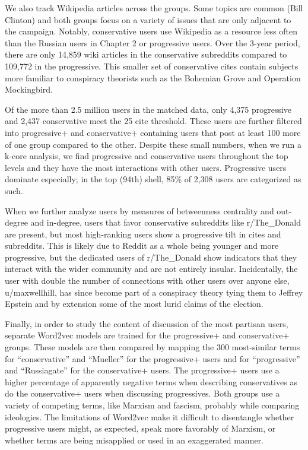 \documentclass[doublespacing]{utdthesis}
\begin{document}
We also track Wikipedia articles across the groups.
Some topics are common (Bill Clinton) and both groups focus on a variety of issues that are only adjacent to the campaign.
Notably, conservative users use Wikipedia as a resource less often than the Russian users in Chapter 2 or progressive users.
Over the 3-year period, there are only 14,859 wiki articles in the conservative subreddits compared to 109,772 in the progressive.
This smaller set of conservative cites contain subjects more familiar to conspiracy theorists such as the Bohemian Grove and Operation Mockingbird.

Of the more than 2.5 million users in the matched data, only 4,375 progressive and 2,437 conservative meet the 25 cite threshold.
These users are further filtered into progressive+ and conservative+ containing users that post at least 100 more of one group compared to the other.
Despite these small numbers, when we run a k-core analysis, we find progressive and conservative users throughout the top levels and they have the most interactions with other users.
Progressive users dominate especially; in the top (94th) shell, 85\% of 2,308 users are categorized as such.

When we further analyze users by measures of betweenness centrality and out-degree and in-degree, users that favor conservative subreddits like r/The\_Donald are present, but most high-ranking users show a progressive tilt in cites and subreddits.
This is likely due to Reddit as a whole being younger and more progressive, but the dedicated users of r/The\_Donald show indicators that they interact with the wider community and are not entirely insular.
Incidentally, the user with double the number of connections with other users over anyone else, u/maxwellhill, has since become part of a conspiracy theory tying them to Jeffrey Epstein and by extension some of the most lurid claims of the election.

Finally, in order to study the content of discussion of the most partisan users, separate Word2vec models are trained for the progressive+ and conservative+ groups.
These models are then compared by mapping the 300 most-similar terms for ``conservative'' and ``Mueller'' for the progressive+ users and for ``progressive'' and ``Russiagate'' for the conservative+ users.
The progressive+ users use a higher percentage of apparently negative terms when describing conservatives as do the conservative+ users when discussing progressives.
Both groups use a variety of competing terms, like Marxism and fascism, probably while comparing ideologies.
The limitations of Word2vec make it difficult to disentangle whether progressive users might, as expected, speak more favorably of Marxism, or whether terms are being misapplied or used in an exaggerated manner.
\end{document}
